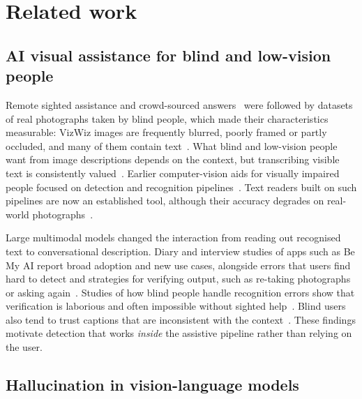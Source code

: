 \documentclass[pdflatex,sn-mathphys-num]{sn-jnl}%
\theoremstyle{thmstyleone}%
\theoremstyle{thmstyletwo}%
\theoremstyle{thmstylethree}%
\begin{document}
\section{Related work}\label{sec:related}

\subsection{AI visual assistance for blind and low-vision people}

Remote sighted assistance and crowd-sourced answers~\cite{bigham2010vizwiz} were followed by datasets of real photographs taken by blind people, which made their characteristics measurable: VizWiz images are frequently blurred, poorly framed or partly occluded, and many of them contain text~\cite{gurari2018vizwiz,gurari2020captioning}. What blind and low-vision people want from image descriptions depends on the context, but transcribing visible text is consistently valued~\cite{stangl2020person}. Earlier computer-vision aids for visually impaired people focused on detection and recognition pipelines~\cite{zatserkovnyi2021cv,khan2020insight}. Text readers built on such pipelines are now an established tool, although their accuracy degrades on real-world photographs~\cite{granquist2021evaluation}.

Large multimodal models changed the interaction from reading out recognised text to conversational description. Diary and interview studies of apps such as Be My AI report broad adoption and new use cases, alongside errors that users find hard to detect and strategies for verifying output, such as re-taking photographs or asking again~\cite{gonzalezpenuela2024investigating,xie2025beyond,adnin2024king}. Studies of how blind people handle recognition errors show that verification is laborious and often impossible without sighted help~\cite{alharbi2024misfitting,hong2024understanding}. Blind users also tend to trust captions that are inconsistent with the context~\cite{macleod2017understanding}. These findings motivate detection that works \emph{inside} the assistive pipeline rather than relying on the user.

\subsection{Hallucination in vision-language models}
\end{document}
